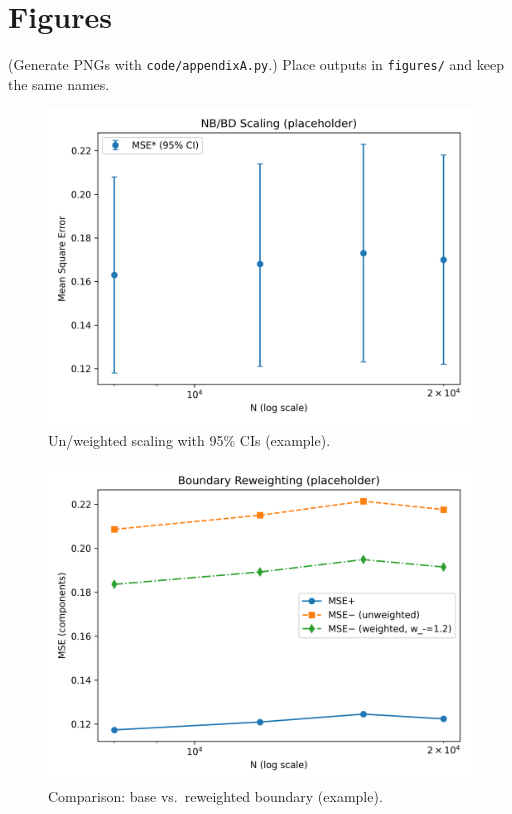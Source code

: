\documentclass[11pt]{article}
\theoremstyle{remark}
\begin{document}
\section{Figures}
(Generate PNGs with \texttt{code/appendixA.py}.) Place outputs in \texttt{figures/} and keep the same names.

\begin{figure}[h]
\centering
\includegraphics[width=.8\linewidth]{figures/mse_scaling.png}
\caption{Un/weighted scaling with 95\% CIs (example).}
\end{figure}

\begin{figure}[h]
\centering
\includegraphics[width=.8\linewidth]{figures/zero_free_comparison.png}
\caption{Comparison: base vs.\ reweighted boundary (example).}
\end{figure}
\end{document}
